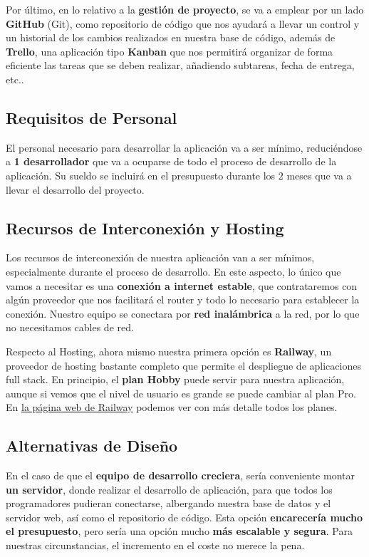 Por último, en lo relativo a la \textbf{gestión de proyecto}, se va a emplear por un lado \textbf{GitHub} (Git), como repositorio de código que nos ayudará a llevar un control y un historial de los cambios realizados en nuestra base de código, además de \textbf{Trello}, una aplicación tipo \textbf{Kanban} que nos permitirá organizar de forma eficiente las tareas que se deben realizar, añadiendo subtareas, fecha de entrega, etc.. 

\subsection{Requisitos de Personal}
El personal necesario para desarrollar la aplicación va a ser mínimo, reduciéndose a \textbf{1 desarrollador} que va a ocuparse de todo el proceso de desarrollo de la aplicación. Su sueldo se incluirá en el presupuesto durante los 2 meses que va a llevar el desarrollo del proyecto.

\subsection{Recursos de Interconexión y Hosting}
Los recursos de interconexión de nuestra aplicación van a ser mínimos, especialmente durante el proceso de desarrollo. En este aspecto, lo único que vamos a necesitar es una \textbf{conexión a internet estable}, que contrataremos con algún proveedor que nos facilitará el router y todo lo necesario para establecer la conexión. Nuestro equipo se conectara por \textbf{red inalámbrica} a la red, por lo que no necesitamos cables de red.

Respecto al \gls{Hosting}, ahora mismo nuestra primera opción es\textbf{ Railway}, un proveedor de hosting bastante completo que permite el despliegue de aplicaciones full stack. En principio, el \textbf{plan Hobby} puede servir para nuestra aplicación, aunque si vemos que el nivel de usuario es grande se puede cambiar al plan Pro. En \href{https://railway.com/}{la página web de Railway} podemos ver con más detalle todos los planes.

\subsection{Alternativas de Diseño}
En el caso de que el \textbf{equipo de desarrollo creciera}, sería conveniente montar \textbf{un servidor}, donde realizar el desarrollo de aplicación, para que todos los programadores pudieran conectarse, albergando nuestra base de datos y el servidor web, así como el repositorio de código. Esta opción \textbf{encarecería mucho el presupuesto}, pero sería una opción mucho \textbf{más escalable y segura}. Para nuestras circunstancias, el incremento en el coste no merece la pena.

